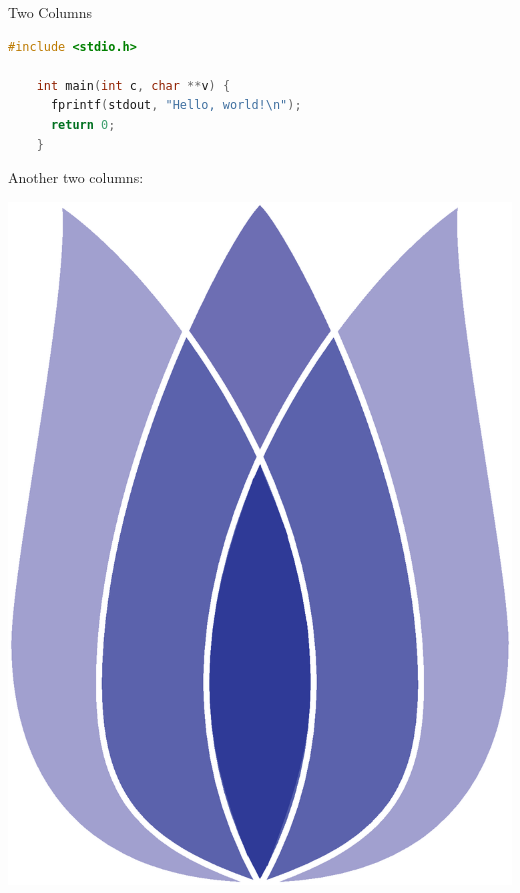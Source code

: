 \documentclass[
 size=12pt,
 paper=smartboard, %
 mode=present, %
 display=slides, %
style=tuliplab,
pauseslide,
fleqn,leqno]{powerdot}
\begin{document}
\begin{slide}[method=direct]{Two Columns}
  \begin{lstlisting}[language=c,gobble=4]
    #include <stdio.h>

    int main(int c, char **v) {
      fprintf(stdout, "Hello, world!\n");
      return 0;
    }
  \end{lstlisting}
Another two columns:

{
     \centerline{\includegraphics[scale=.3]{logos/tulip-logo.eps}}
}

\end{slide}
\end{document}
